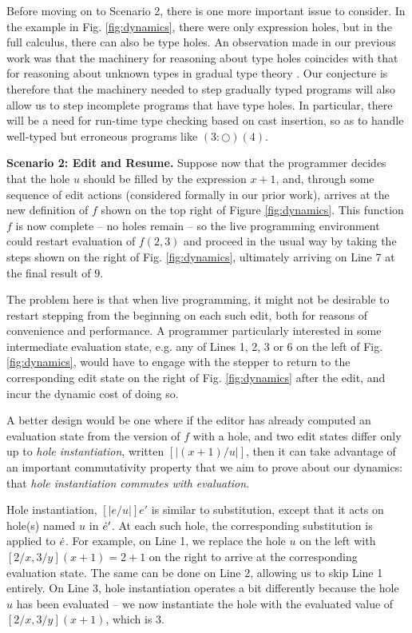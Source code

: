 Before moving on to Scenario 2, there is one more important issue to consider. In the example in Fig. \ref{fig:dynamics}, there were only expression holes, but in the full calculus, there can also be type holes. An observation made in our previous work was that the machinery for reasoning about type holes coincides with that for reasoning about unknown types in gradual type theory \cite{Siek06a}. Our conjecture is therefore that the machinery needed to step gradually typed programs will also allow us to step incomplete programs that have type holes. In particular, there will be a need for run-time type checking based on cast insertion, so as to handle well-typed but erroneous programs like $(3 : \Circle)(4)$. 

\vspace{1ex}
\noindent\textbf{Scenario 2: Edit and Resume.}
Suppose now that the programmer decides that the hole $u$ should
 be filled by the expression $x+1$, and, through some sequence of edit actions (considered formally in our prior work), arrives at 
the new definition of $f$ shown on the top right of Figure \ref{fig:dynamics}. This function $f$ is now complete -- no holes remain -- so the live programming environment 
could restart evaluation of $f(2, 3)$ and proceed in the usual way by taking the steps shown on
the right of Fig. \ref{fig:dynamics}, ultimately arriving on Line 7 at the final result of $9$.

The problem here is that when live programming, it might not be desirable to restart stepping from the beginning on each such edit, both for reasons of convenience and performance. A programmer particularly interested in some intermediate evaluation state, e.g. any of Lines 1, 2, 3 or 6 on the left of Fig. \ref{fig:dynamics}, would have to engage with the stepper to return to the corresponding edit state on the right of Fig. \ref{fig:dynamics} after the edit, and incur the dynamic cost of doing so.

A better design would be one where if the editor has already computed an evaluation 
state from the version of $f$ with a hole, and  
two edit states differ only up to \emph{hole instantiation}, written 
$[\!| (x+1) / u
|\!]$, then it can take advantage of an important commutativity property that we aim 
to prove about our dynamics: that 
\emph{hole instantiation commutes with evaluation}. 

Hole instantiation, $[\!| e / u |\!]e'$ is similar to substitution, except that it acts on
 hole(s) named $u$ in $\dot{e}'$. At each such hole, the corresponding substitution is applied to $\dot{e}$. For example, on Line 1, we replace the hole $u$ on the left with $[2/x,3/y](x+1) = 2 + 1$ on the right to arrive at the corresponding evaluation state. The same can be done on Line 2, allowing us to skip Line 1 entirely. On Line 3, hole instantiation operates a bit differently because the hole $u$ has been evaluated -- we now instantiate the hole with the evaluated value of $[2/x, 3/y](x + 1)$, which is $3$. 

